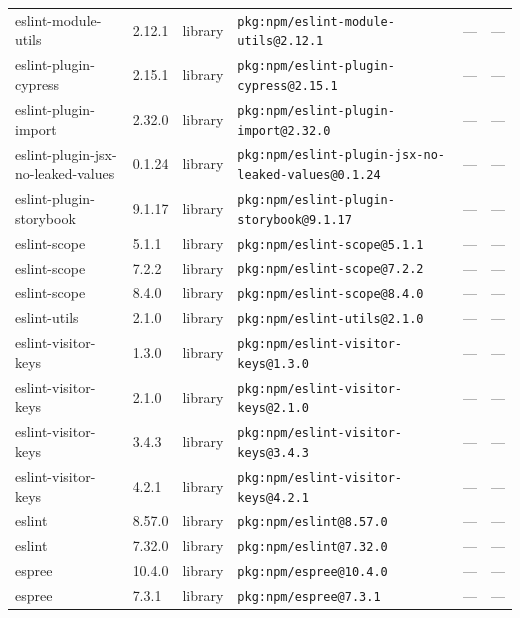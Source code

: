 \documentclass[11pt,a4paper]{article}
\begin{document}
\begin{longtable}{|p{4cm}|p{2cm}|p{1.6cm}|p{5cm}|p{1.5cm}|p{3.5cm}|}
\raggedright eslint-module-utils & 2.12.1 & library & \small\texttt{pkg:npm/eslint-module-utils@2.12.1} & — & \small — \\
\raggedright eslint-plugin-cypress & 2.15.1 & library & \small\texttt{pkg:npm/eslint-plugin-cypress@2.15.1} & — & \small — \\
\raggedright eslint-plugin-import & 2.32.0 & library & \small\texttt{pkg:npm/eslint-plugin-import@2.32.0} & — & \small — \\
\raggedright eslint-plugin-jsx-no-leaked-values & 0.1.24 & library & \small\texttt{pkg:npm/eslint-plugin-jsx-no-leaked-values@0.1.24} & — & \small — \\
\raggedright eslint-plugin-storybook & 9.1.17 & library & \small\texttt{pkg:npm/eslint-plugin-storybook@9.1.17} & — & \small — \\
\raggedright eslint-scope & 5.1.1 & library & \small\texttt{pkg:npm/eslint-scope@5.1.1} & — & \small — \\
\raggedright eslint-scope & 7.2.2 & library & \small\texttt{pkg:npm/eslint-scope@7.2.2} & — & \small — \\
\raggedright eslint-scope & 8.4.0 & library & \small\texttt{pkg:npm/eslint-scope@8.4.0} & — & \small — \\
\raggedright eslint-utils & 2.1.0 & library & \small\texttt{pkg:npm/eslint-utils@2.1.0} & — & \small — \\
\raggedright eslint-visitor-keys & 1.3.0 & library & \small\texttt{pkg:npm/eslint-visitor-keys@1.3.0} & — & \small — \\
\raggedright eslint-visitor-keys & 2.1.0 & library & \small\texttt{pkg:npm/eslint-visitor-keys@2.1.0} & — & \small — \\
\raggedright eslint-visitor-keys & 3.4.3 & library & \small\texttt{pkg:npm/eslint-visitor-keys@3.4.3} & — & \small — \\
\raggedright eslint-visitor-keys & 4.2.1 & library & \small\texttt{pkg:npm/eslint-visitor-keys@4.2.1} & — & \small — \\
\raggedright eslint & 8.57.0 & library & \small\texttt{pkg:npm/eslint@8.57.0} & — & \small — \\
\raggedright eslint & 7.32.0 & library & \small\texttt{pkg:npm/eslint@7.32.0} & — & \small — \\
\raggedright espree & 10.4.0 & library & \small\texttt{pkg:npm/espree@10.4.0} & — & \small — \\
\raggedright espree & 7.3.1 & library & \small\texttt{pkg:npm/espree@7.3.1} & — & \small — \\

\end{longtable}
\end{document}
